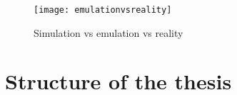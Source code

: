 





\begin{figure}
  \centering
  \texttt{[image: emulationvsreality]}
  \caption{Simulation vs emulation vs reality}
  \label{fig:emulationvsreality}
\end{figure}


\section{Structure of the thesis}
\label{sec:structure}



